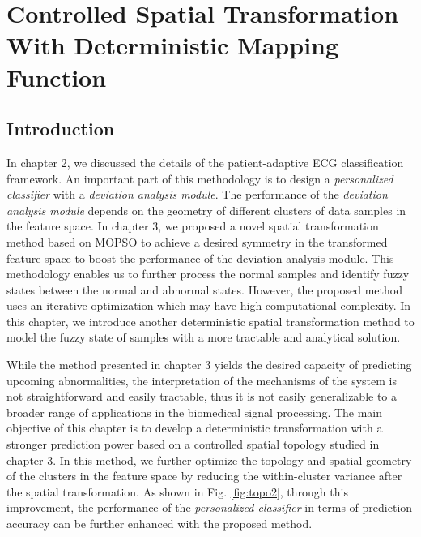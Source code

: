 \chapter{Controlled Spatial Transformation With Deterministic Mapping Function}
\section{Introduction}


In chapter 2, we discussed the details of the patient-adaptive ECG classification framework. An important part of this methodology is to design a \textit{personalized classifier} with a \textit{deviation analysis module}. The performance of the \textit{deviation analysis module} depends on the geometry of different clusters of data samples in the feature space. In chapter 3, we proposed a novel spatial transformation method based on MOPSO to achieve a desired symmetry in the transformed feature space to boost the performance of the deviation analysis module. This methodology enables us to further process the normal samples and identify fuzzy states between the normal and abnormal states. However, the proposed method uses an iterative optimization which may have high computational complexity. In this chapter, we introduce another deterministic spatial transformation method to model the fuzzy state of samples with a more tractable and analytical solution. %

 
While the method presented in chapter 3 yields the desired capacity of predicting upcoming abnormalities, the interpretation of the mechanisms of the system is not straightforward and easily tractable, thus it is not easily generalizable to a broader range of applications in the biomedical signal processing. The main objective of this chapter is to develop a deterministic transformation with a stronger prediction power based on a controlled spatial topology studied in chapter 3. In this method, we further optimize the topology and spatial geometry of the clusters in the feature space by reducing the within-cluster variance after the spatial transformation. As shown in Fig. \ref{fig:topo2}, through this improvement, the performance of the \textit{personalized classifier} in terms of prediction accuracy can be further enhanced with the proposed method.
 
